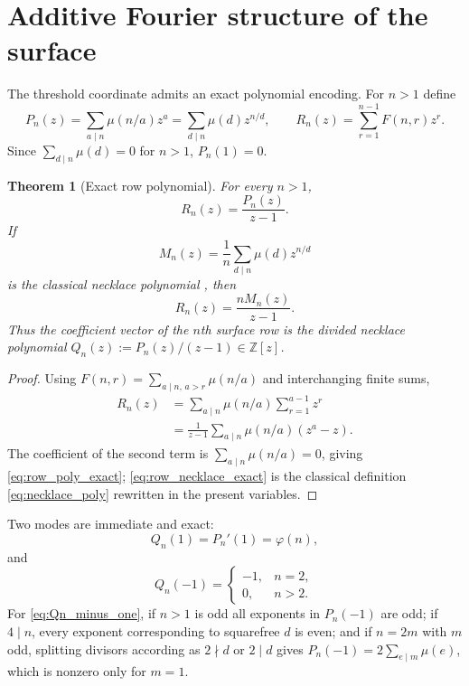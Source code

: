 \documentclass[11pt]{amsart}
\numberwithin{equation}{section}
\theoremstyle{plain}
\newtheorem{theorem}{Theorem}[section]
\theoremstyle{definition}
\theoremstyle{remark}
\newcommand{\Z}{\mathbb Z}
\newcommand{\mob}{\mu}
\newcommand{\Fsurf}{F}
\begin{document}
\section{Additive Fourier structure of the surface}
\label{sec:additive_fourier}

The threshold coordinate admits an exact polynomial encoding.  For $n>1$ define
\begin{equation}
P_n(z)=\sum_{a\mid n}\mob(n/a)z^a
      =\sum_{d\mid n}\mob(d)z^{n/d},
\qquad
R_n(z)=\sum_{r=1}^{n-1}\Fsurf(n,r)z^r.
\label{eq:Pn_Rn_def}
\end{equation}
Since $\sum_{d\mid n}\mob(d)=0$ for $n>1$, $P_n(1)=0$.

\begin{theorem}[Exact row polynomial]
\label{thm:row_necklace}
For every $n>1$,
\begin{equation}
R_n(z)=\frac{P_n(z)}{z-1}.
\label{eq:row_poly_exact}
\end{equation}
If
\begin{equation}
M_n(z)=\frac1n\sum_{d\mid n}\mob(d)z^{n/d}
\label{eq:necklace_poly}
\end{equation}
is the classical necklace polynomial \cite{MetropolisRota1983}, then
\begin{equation}
R_n(z)=\frac{nM_n(z)}{z-1}.
\label{eq:row_necklace_exact}
\end{equation}
Thus the coefficient vector of the $n$th surface row is the divided necklace polynomial $Q_n(z):=P_n(z)/(z-1)\in\Z[z]$.
\end{theorem}

\begin{proof}
Using $\Fsurf(n,r)=\sum_{a\mid n,\,a>r}\mob(n/a)$ and interchanging finite sums,
\begin{align}
R_n(z)
&=\sum_{a\mid n}\mob(n/a)\sum_{r=1}^{a-1}z^r\\
&=\frac{1}{z-1}\sum_{a\mid n}\mob(n/a)(z^a-z).
\end{align}
The coefficient of the second term is $\sum_{a\mid n}\mob(n/a)=0$, giving \eqref{eq:row_poly_exact}; \eqref{eq:row_necklace_exact} is the classical definition \eqref{eq:necklace_poly} rewritten in the present variables.
\end{proof}

Two modes are immediate and exact:
\begin{equation}
Q_n(1)=P_n'(1)=\varphi(n),
\label{eq:Qn_zero_mode}
\end{equation}
and
\begin{equation}
Q_n(-1)=
\begin{cases}
-1,&n=2,\\
0,&n>2.
\end{cases}
\label{eq:Qn_minus_one}
\end{equation}
For \eqref{eq:Qn_minus_one}, if $n>1$ is odd all exponents in $P_n(-1)$ are odd; if $4\mid n$, every exponent corresponding to squarefree $d$ is even; and if $n=2m$ with $m$ odd, splitting divisors according as $2\nmid d$ or $2\mid d$ gives $P_n(-1)=2\sum_{e\mid m}\mob(e)$, which is nonzero only for $m=1$.
\end{document}
